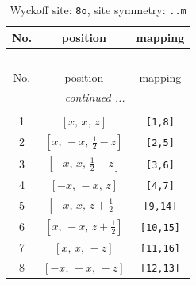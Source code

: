 \documentclass[fleqn,8pt]{jsarticle}
\begin{document}
\begin{longtable}{ccc}
\caption{Wyckoff site: {\tt 8o}, site symmetry: {\tt ..m}}
 \\
 \hline \hline
No. & position & mapping \\ \hline \endfirsthead

\multicolumn{2}{l}{\tablename\ \thetable{}} \\
 \hline \hline
No. & position & mapping \\ \hline \endhead

 \hline \hline
\multicolumn{2}{r}{\footnotesize\it continued ...} \\ \endfoot

 \hline \hline
\multicolumn{2}{r}{} \\ \endlastfoot

1 & $\left[ x,\, x,\, z \right]$ & {\tt [1,8]} \\ \hline
2 & $\left[ x,\, - x,\, \frac{1}{2} - z \right]$ & {\tt [2,5]} \\ \hline
3 & $\left[ - x,\, x,\, \frac{1}{2} - z \right]$ & {\tt [3,6]} \\ \hline
4 & $\left[ - x,\, - x,\, z \right]$ & {\tt [4,7]} \\ \hline
5 & $\left[ - x,\, x,\, z + \frac{1}{2} \right]$ & {\tt [9,14]} \\ \hline
6 & $\left[ x,\, - x,\, z + \frac{1}{2} \right]$ & {\tt [10,15]} \\ \hline
7 & $\left[ x,\, x,\, - z \right]$ & {\tt [11,16]} \\ \hline
8 & $\left[ - x,\, - x,\, - z \right]$ & {\tt [12,13]} \\
\end{longtable}
\renewcommand{\arraystretch}{1.2}
\end{document}
